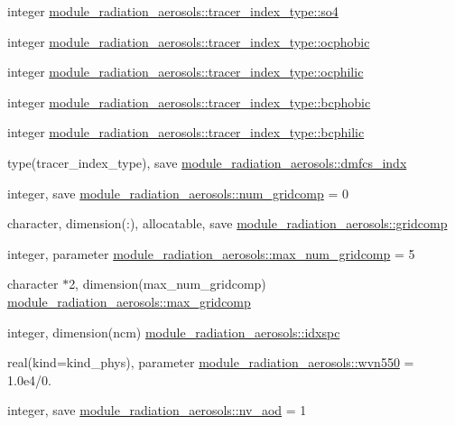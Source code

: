 \begin{DoxyCompactItemize}
integer \hyperlink{group__module__radiation__aerosols_gaa73b4be9d303cfce2c00407204c5f930}{module\+\_\+radiation\+\_\+aerosols\+::tracer\+\_\+index\+\_\+type\+::so4}
\item 
integer \hyperlink{group__module__radiation__aerosols_ga3ace1c1bbade423efd216e676511c470}{module\+\_\+radiation\+\_\+aerosols\+::tracer\+\_\+index\+\_\+type\+::ocphobic}
\item 
integer \hyperlink{group__module__radiation__aerosols_ga95e99f68fc7344f78f2ee316bc447651}{module\+\_\+radiation\+\_\+aerosols\+::tracer\+\_\+index\+\_\+type\+::ocphilic}
\item 
integer \hyperlink{group__module__radiation__aerosols_ga4b1c1a1b44b5eb68ec19abb48e748fa0}{module\+\_\+radiation\+\_\+aerosols\+::tracer\+\_\+index\+\_\+type\+::bcphobic}
\item 
integer \hyperlink{group__module__radiation__aerosols_ga776ae744bfaad492a1aeccf32864d1a0}{module\+\_\+radiation\+\_\+aerosols\+::tracer\+\_\+index\+\_\+type\+::bcphilic}
\item 
type(tracer\+\_\+index\+\_\+type), save \hyperlink{group__module__radiation__aerosols_gad6c4782fbaae13df20891197b67568ec}{module\+\_\+radiation\+\_\+aerosols\+::dmfcs\+\_\+indx}
\item 
integer, save \hyperlink{group__module__radiation__aerosols_ga6ddeb7b34ad2d6ab1575be3520e85891}{module\+\_\+radiation\+\_\+aerosols\+::num\+\_\+gridcomp} = 0
\item 
character, dimension(\+:), allocatable, save \hyperlink{group__module__radiation__aerosols_ga48c2c6c9c509f5c37fea5d788040ad7a}{module\+\_\+radiation\+\_\+aerosols\+::gridcomp}
\item 
integer, parameter \hyperlink{group__module__radiation__aerosols_gad1187b5d87889c68cbe5929e20e83ac7}{module\+\_\+radiation\+\_\+aerosols\+::max\+\_\+num\+\_\+gridcomp} = 5
\item 
character $\ast$2, dimension(max\+\_\+num\+\_\+gridcomp) \hyperlink{group__module__radiation__aerosols_gac8278b0db773d6ba6ab4d71c9bb1b109}{module\+\_\+radiation\+\_\+aerosols\+::max\+\_\+gridcomp}
\item 
integer, dimension(ncm) \hyperlink{group__module__radiation__aerosols_ga8ca79ca1e5161374aff3cad4121b360f}{module\+\_\+radiation\+\_\+aerosols\+::idxspc}
\item 
real(kind=kind\+\_\+phys), parameter \hyperlink{group__module__radiation__aerosols_ga4555a127ac5bab48353628ea81c55e4e}{module\+\_\+radiation\+\_\+aerosols\+::wvn550} = 1.\+0e4/0.
\item 
integer, save \hyperlink{group__module__radiation__aerosols_ga112670c954eb372efc017253b1096b17}{module\+\_\+radiation\+\_\+aerosols\+::nv\+\_\+aod} = 1
\end{DoxyCompactItemize}
